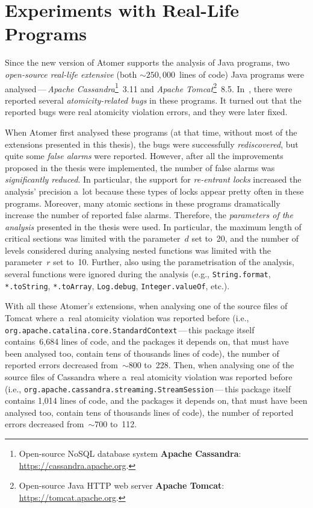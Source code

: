 \section{Experiments with Real-Life Programs}
\label{sec:expReal}

Since the new version of Atomer supports the analysis of Java programs, two \emph{open-source real-life extensive} (both $ \sim\!\!250,000 $\ lines of code) Java programs were analysed\,---\,\emph{Apache Cassandra}\footnote{Open-source NoSQL database system \textbf{Apache Cassandra}: \url{https://cassandra.apache.org}.}~3.11 and \emph{Apache Tomcat}\footnote{Open-source Java HTTP web server \textbf{Apache Tomcat}: \url{https://tomcat.apache.org}.}~8.5. In~\cite{contracts2017}, there were reported several \emph{atomicity-related bugs} in these programs. It turned out that the reported bugs were real atomicity violation errors, and they were later fixed.

When Atomer first analysed these programs (at that time, without most of the extensions presented in this thesis), the bugs were successfully \emph{rediscovered}, but quite some \emph{false alarms} were reported. However, after all the improvements proposed in the thesis were implemented, the number of false alarms was \emph{significantly reduced}. In particular, the support for \emph{re-entrant locks} increased the analysis' precision a~lot because these types of locks appear pretty often in these programs. Moreover, many  atomic sections in these programs dramatically increase the number of reported false alarms. Therefore, the \emph{parameters of the analysis} presented in the thesis were used. In particular, the maximum length of critical sections was limited with the parameter~$ d $ set to~20, and the number of levels considered during analysing nested functions was limited with the parameter~$ r $ set to~10. Further, also using the parametrisation of the analysis, several  functions were ignored during the analysis (e.g., \texttt{String.format}, \texttt{*.toString}, \texttt{*.toArray}, \texttt{Log.debug}, \texttt{Integer.valueOf}, etc.).

With all these Atomer's extensions, when analysing one of the source files of Tomcat where a~real atomicity violation was reported before (i.e., \texttt{org.apache.catalina.core.Stan\-dardContext}\,---\,this package itself contains~6,684 lines of code, and the packages it depends on, that must have been analysed too, contain tens of thousands lines of code), the number of reported errors decreased from~$ \sim\!\!800 $ to~228. Then, when analysing one of the source files of Cassandra where a~real atomicity violation was reported before (i.e., \texttt{org.apache.cassandra.streaming.StreamSession}\,---\,this package itself contains 1,014 lines of code, and the packages it depends on, that must have been analysed too, contain tens of thousands lines of code), the number of reported errors decreased from~$ \sim\!\!700 $ to~112.

